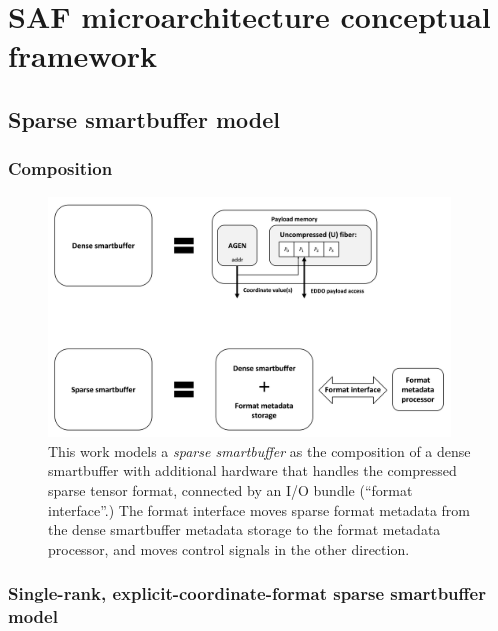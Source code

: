 \chapter{SAF microarchitecture conceptual framework}
\label{chapter:conceptual_framework}

\section{Sparse smartbuffer model}

\subsection{Composition}

\begin{figure}[ht]
    \centering
    \includegraphics[width=0.95\textwidth]{figures/dense_smartbuffer_composition.png}
    \caption{This work models a \textit{sparse smartbuffer} as the composition of a dense smartbuffer with additional hardware that handles the compressed sparse tensor format, connected by an I/O bundle (``format interface''.) The format interface moves sparse format metadata from the dense smartbuffer metadata storage to the format metadata processor, and moves control signals in the other direction.}
    \label{fig:dense_smartbuffer_composition}
\end{figure}

\subsection{Single-rank, explicit-coordinate-format sparse smartbuffer model}

